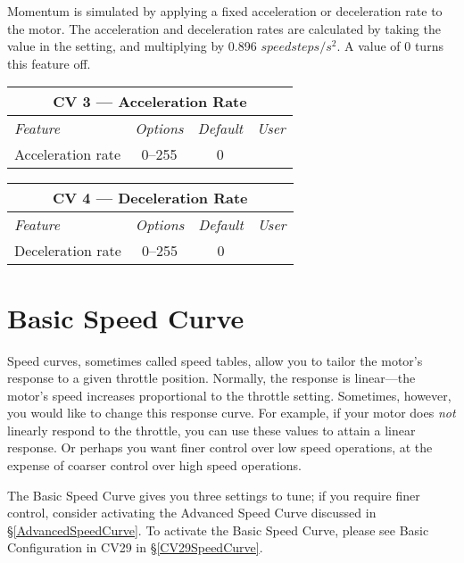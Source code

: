\documentclass[12pt,letterpaper,draft]{memoir} %
\begin{document}
Momentum is simulated by applying a fixed acceleration or deceleration rate to the motor. The acceleration and deceleration rates are calculated by taking the value in the setting, and multiplying by 0.896 $\mathit{speed steps}/s^2$. A value of 0 turns this feature off.


\label{CV3}
\begin{center}
\begin{tabular}{|l|c|c|c|}
\hline
\multicolumn{4}{|c|}{\textbf{CV 3 --- Acceleration Rate}} \\ \hline \hline
\textit{Feature} & \textit{Options} & \textit{Default} & \textit{User} \\ \hline
Acceleration rate & 0--255 & 0 &\\ \hline
\end{tabular}
\end{center}

\label{CV4}
\begin{center}
\begin{tabular}{|l|c|c|c|}
\hline
\multicolumn{4}{|c|}{\textbf{CV 4 --- Deceleration Rate}} \\ \hline \hline
\textit{Feature} & \textit{Options} & \textit{Default} & \textit{User} \\ \hline
Deceleration rate & 0--255 & 0 &\\ \hline
\end{tabular}
\end{center}

\section{Basic Speed Curve}
\label{BasicSpeedCurve}

Speed curves, sometimes called speed tables, allow you to tailor the motor's response to a given throttle position. Normally, the response is linear---the motor's speed increases proportional to the throttle setting. Sometimes, however, you would like to change this response curve. For example, if your motor does \textit{not} linearly respond to the throttle, you can use these values to attain a linear response. Or perhaps you want finer control over low speed operations, at the expense of coarser control over high speed operations.

The Basic Speed Curve gives you three settings to tune; if you require finer control, consider activating the Advanced Speed Curve discussed in \S\ref{AdvancedSpeedCurve}. To activate the Basic Speed Curve, please see Basic Configuration in CV29 in \S\ref{CV29SpeedCurve}.
\end{document}
